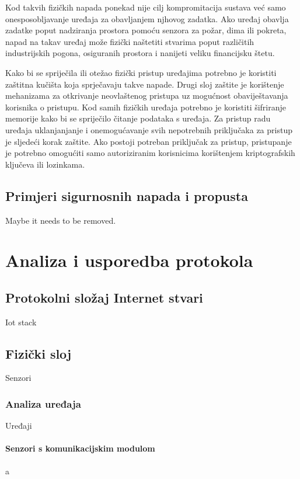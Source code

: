\documentclass[times, utf8, diplomski]{fer}
\begin{document}
Kod takvih fizičkih napada ponekad nije cilj kompromitacija sustava već samo onesposobljavanje uređaja za obavljanjem njhovog zadatka. Ako uređaj obavlja zadatke poput nadziranja prostora pomoću senzora za požar, dima ili pokreta, napad na takav uređaj može fizički naštetiti stvarima poput različitih industrijskih pogona, osiguranih prostora i nanijeti veliku financijsku štetu.

Kako bi se spriječila ili otežao fizički pristup uređajima potrebno je koristiti zaštitna kučišta koja sprječavaju takve napade. Drugi sloj zaštite je korištenje mehanizama za otkrivanje neovlaštenog pristupa uz mogućnost obaviještavanja korisnika o pristupu. Kod samih fizičkih uređaja potrebno je koristiti šifriranje memorije kako bi se spriječilo čitanje podataka s uređaja. Za pristup radu uređaja uklanjanjanje i onemogućavanje svih nepotrebnih priključaka za pristup je sljedeći korak zaštite. Ako postoji potreban priključak za pristup, pristupanje je potrebno omogućiti samo autoriziranim korisnicima korištenjem kriptografskih ključeva ili lozinkama.

\section{Primjeri sigurnosnih napada i propusta}
Maybe it needs to be removed.

\chapter{Analiza i usporedba protokola}

\section{Protokolni složaj Internet stvari}
Iot stack

\section{Fizički sloj}
Senzori

\subsection{Analiza uređaja}
Uređaji

\subsubsection{Senzori s komunikacijskim modulom}
a
\end{document}
